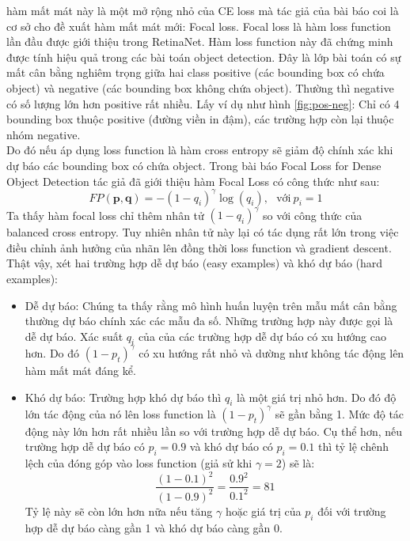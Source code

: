 \documentclass[a4paper, 12pt]{report}
\begin{document}
hàm mất mát này là một mở rộng nhỏ của CE loss mà tác giả của bài báo coi là cơ sở cho đề xuất hàm mất mát mới: Focal loss. Focal loss là hàm loss function lần đầu được giới thiệu trong RetinaNet. Hàm loss function này đã chứng minh được tính hiệu quả trong các bài toán object detection. Đây là lớp bài toán có sự mất cân bằng nghiêm trọng giữa hai class positive (các bounding box có chứa object) và negative (các bounding box không chứa object). Thường thì negative có số lượng lớn hơn positive rất nhiều. Lấy ví dụ như hình \ref{fig:pos-neg}: Chỉ có 4 bounding box thuộc positive (đường viền in đậm), các trường hợp còn lại thuộc nhóm negative. \\
Do đó nếu áp dụng loss function là hàm cross entropy sẽ giảm độ chính xác khi dự báo các bounding box có chứa object. Trong bài báo Focal Loss for Dense Object Detection tác giả đã giới thiệu hàm Focal Loss có công thức như sau:
\begin{equation}
	FP(\mathbf{p}, \mathbf{q}) = - (1-q_i)^{\gamma} \log(q_i), ~~~ \text{với} ~ p_i=1
\end{equation}
Ta thấy hàm focal loss chỉ thêm nhân tử $(1-q_i)^{\gamma}$ so với công thức của balanced cross entropy. Tuy nhiên nhân tử này lại có tác dụng rất lớn trong việc điều chỉnh ảnh hưởng của nhãn lên đồng thời loss function và gradient descent. Thật vậy, xét hai trường hợp dễ dự báo (easy examples) và khó dự báo (hard examples):
\begin{itemize}
	\item Dễ dự báo: Chúng ta thấy rằng mô hình huấn luyện trên mẫu mất cân bằng thường dự báo chính xác các mẫu đa số. Những trường hợp này được gọi là dễ dự báo. Xác suất $q_i$ của của các trường hợp dễ dự báo có xu hướng cao hơn. Do đó $(1-p_t)^{\gamma}$  có xu hướng rất nhỏ và dường như không tác động lên hàm mất mát đáng kể.
	\item Khó dự báo: Trường hợp khó dự báo thì  $q_i$  là một giá trị nhỏ hơn. Do đó độ lớn tác động của nó lên loss function là $(1-p_t)^{\gamma}$ sẽ gần bằng 1. Mức độ tác động này lớn hơn rất nhiều lần so với trường hợp dễ dự báo. Cụ thể hơn, nếu trường hợp dễ dự báo có $p_i = 0.9$ và khó dự báo có $p_i = 0.1$ thì tỷ lệ chênh lệch của đóng góp vào loss function (giả sử khi $\gamma=2$) sẽ là:
 \begin{equation*}
 	\frac{(1-0.1)^2}{(1-0.9)^2} = \frac{0.9^2}{0.1^2} = 81
 \end{equation*}
Tỷ lệ này sẽ còn lớn hơn nữa nếu tăng $\gamma$ hoặc giá trị của $p_i$ đối với trường hợp dễ dự báo càng gần 1 và khó dự báo càng gần 0.

\end{itemize}
\end{document}
